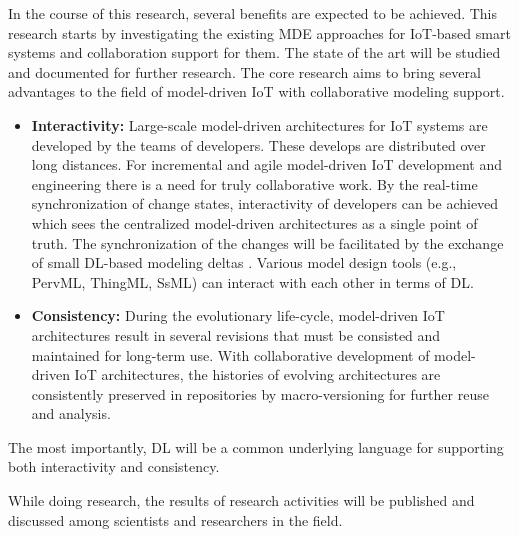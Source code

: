 In the course of this research, several benefits are expected to be achieved. This research starts by investigating the existing MDE approaches for IoT-based smart systems and collaboration support for them. The state of the art will be studied and documented for further research. The core research aims to bring several advantages to the field of model-driven IoT with collaborative modeling support.
\begin{itemize}
\item \textbf{Interactivity:} Large-scale model-driven architectures for IoT systems are developed by the teams of developers. These develops are distributed over long distances. For incremental and agile model-driven IoT development and engineering there is a need for truly collaborative work. By the real-time synchronization of change states, interactivity of developers can be achieved which sees the centralized model-driven architectures as a single point of truth. The synchronization of the changes will be facilitated by the exchange of small DL-based modeling deltas \cite{Kuryazov+2018}. Various model design tools (e.g., PervML, ThingML, SsML) can interact with each other in terms of DL.
\item \textbf{Consistency:} During the evolutionary life-cycle, model-driven IoT architectures result in several revisions that must be consisted and maintained for long-term use. With collaborative development of model-driven IoT architectures, the histories of evolving architectures are consistently preserved in repositories by macro-versioning for further reuse and analysis.
\end{itemize}

The most importantly, DL will be a common underlying language for supporting both interactivity and consistency.

While doing research, the results of research activities will be published and discussed among scientists and researchers in the field.